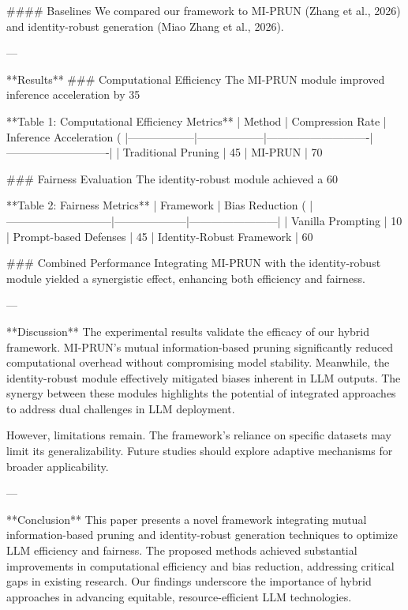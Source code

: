 #### Baselines  
We compared our framework to MI-PRUN (Zhang et al., 2026) and identity-robust generation (Miao Zhang et al., 2026).

---

**Results**  
### Computational Efficiency  
The MI-PRUN module improved inference acceleration by 35%

**Table 1: Computational Efficiency Metrics**  
| Method          | Compression Rate | Inference Acceleration (%
|------------------|------------------|----------------------------|----------------------------|  
| Traditional Pruning | 45%
| MI-PRUN            | 70%

### Fairness Evaluation  
The identity-robust module achieved a 60%

**Table 2: Fairness Metrics**  
| Framework                   | Bias Reduction (%
|-----------------------------|--------------------|------------------------|  
| Vanilla Prompting           | 10%
| Prompt-based Defenses       | 45%
| Identity-Robust Framework   | 60%

### Combined Performance  
Integrating MI-PRUN with the identity-robust module yielded a synergistic effect, enhancing both efficiency and fairness.

---

**Discussion**  
The experimental results validate the efficacy of our hybrid framework. MI-PRUN's mutual information-based pruning significantly reduced computational overhead without compromising model stability. Meanwhile, the identity-robust module effectively mitigated biases inherent in LLM outputs. The synergy between these modules highlights the potential of integrated approaches to address dual challenges in LLM deployment.

However, limitations remain. The framework's reliance on specific datasets may limit its generalizability. Future studies should explore adaptive mechanisms for broader applicability.

---

**Conclusion**  
This paper presents a novel framework integrating mutual information-based pruning and identity-robust generation techniques to optimize LLM efficiency and fairness. The proposed methods achieved substantial improvements in computational efficiency and bias reduction, addressing critical gaps in existing research. Our findings underscore the importance of hybrid approaches in advancing equitable, resource-efficient LLM technologies.

